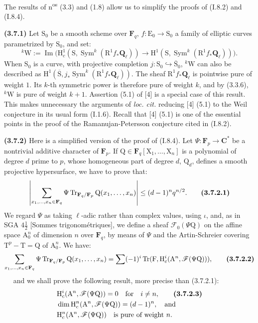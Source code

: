 \documentclass[11pt,leqno]{article}
\newcommand{\Page}[1]{\ifvmode\noindent\else\unskip\ \fi{\footnotesize\textcolor{gray}{[p.\,#1]}}\ \ignorespaces}
\begin{document}
The results of n\textsuperscript{os} (3.3) and (1.8) allow us to simplify the proofs of (I.8.2) and (I.8.4).

\textbf{(3.7.1)} Let \(\mathrm S_0\) be a smooth scheme over \(\mathbf F_q\), \(f:\mathrm E_0\to\mathrm S_0\) a family of elliptic curves parametrized by \(\mathrm S_0\), and set:
\[
{}^k\mathrm W:=\operatorname{Im}\bigl(
\mathrm H_c^1(\mathrm S,\operatorname{Sym}^k(\mathrm R^1f_*\mathbf Q_\ell))
\to\mathrm H^1(\mathrm S,\operatorname{Sym}^k(\mathrm R^1f_*\mathbf Q_\ell))
\bigr).
\]
When \(\mathrm S_0\) is a curve, with projective completion \(j:\mathrm S_0\hookrightarrow\overline{\mathrm S}_0\), \({}^k\mathrm W\) can also be described as \(\mathrm H^1(\overline{\mathrm S},j_*\operatorname{Sym}^k(\mathrm R^1f_*\mathbf Q_\ell))\). The sheaf \(\mathrm R^1f_*\mathbf Q_\ell\) is pointwise pure of weight \(1\). Its \(k\)-th symmetric power is therefore pure of weight \(k\), and by (3.3.6), \({}^k\mathrm W\) is pure of weight \(k+1\). Assertion (5.1) of [4] is a special case of this result. This makes unnecessary the arguments of \textit{loc. cit.} reducing [4] (5.1) to the Weil conjecture in its usual form (I.1.6). Recall that [4] (5.1) is one of the essential points in the proof of the Ramanujan-Petersson conjecture cited in (I.8.2).

\textbf{(3.7.2)} Here is a simplified version of the proof of (I.8.4). Let \(\Psi:\mathbf F_p\to\mathbf C^*\) be a nontrivial additive character of \(\mathbf F_p\). If \(\mathrm Q\in\mathbf F_q[\mathrm X_1,\ldots,\mathrm X_n]\) is a polynomial of degree \(d\) prime to \(p\), whose homogeneous part of degree \(d\), \(\mathrm Q_d\), defines a smooth projective hypersurface, we have to prove that:
\[
\left|
\sum_{x_1,\ldots,x_n\in\mathbf F_q}
\Psi\operatorname{Tr}_{\mathbf F_q/\mathbf F_p}\mathrm Q(x_1,\ldots,x_n)
\right|
\leq(d-1)^nq^{n/2}.
\tag*{\textbf{(3.7.2.1)}}
\]
We regard \(\Psi\) as taking \(\ell\)-adic rather than complex values, using \(\iota\), and, as in SGA \(4\frac{1}{2}\) [Sommes trigonométriques], we define a sheaf \(\mathscr F_0(\Psi\mathrm Q)\) on the affine space \(\mathrm A_0^n\) of dimension \(n\) over \(\mathbf F_q\), by means of \(\Psi\) and the Artin-Schreier covering \(\mathrm T^p-\mathrm T=\mathrm Q\) of \(\mathrm A_0^n\). We have:
\[
\sum_{x_1,\ldots,x_n\in\mathbf F_q}
\Psi\operatorname{Tr}_{\mathbf F_q/\mathbf F_p}\mathrm Q(x_1,\ldots,x_n)
=
\sum(-1)^i\operatorname{Tr}(\mathrm F,\mathrm H_c^i(\mathrm A^n,\mathscr F(\Psi\mathrm Q))),
\tag*{\textbf{(3.7.2.2)}}
\]
\Page{216}
and we shall prove the following result, more precise than (3.7.2.1):
\begin{align*}
&\mathrm H_c^i(\mathrm A^n,\mathscr F(\Psi\mathrm Q))=0
\quad\text{for}\quad i\ne n,
\tag*{\textbf{(3.7.2.3)}}\\
&\dim\mathrm H_c^n(\mathrm A^n,\mathscr F(\Psi\mathrm Q))=(d-1)^n,
\quad\text{and}\\
&\mathrm H_c^n(\mathrm A^n,\mathscr F(\Psi\mathrm Q))
\quad\text{is pure of weight }n.
\end{align*}
\end{document}
